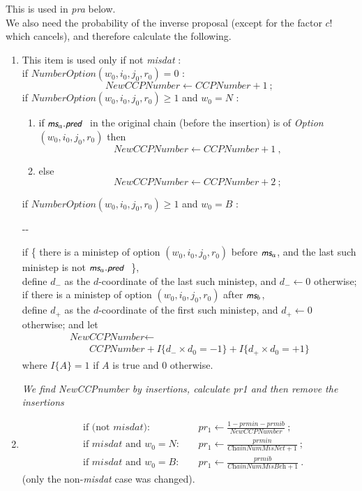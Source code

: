 \documentclass[a4paper,12pt,fleqn]{article}
\makeatletter
\newenvironment{frindentation}[2]
{\par \setlength{\leftmargin}{#1}       \setlength{\rightmargin}{#2}
  \advance\linewidth -\leftmargin       \advance\linewidth -\rightmargin
  \advance\@totalleftmargin\leftmargin  \@setpar{{\@@par}}%
  \parshape 1 \@totalleftmargin         \linewidth \ignorespaces
  \begin{minipage}[h]{\linewidth}\begin{framed}}{\end{framed}\end{minipage}\par}
\newcommand{\nnm}[1]{\textsf{\small\textit{#1}\ }}
\newcommand{\ms}{\textsl{\textsf{\small ms}}} %
\makeatother
\begin{document}
This is used in \textit{pra} below.\\
We also need the probability of the inverse proposal
(except for the factor $c! $ which cancels),
and therefore calculate the following.
\begin{enumerate}[resume]
\item This item is used only if not \textit{misdat} :\\
      if $\textit{NumberOption}(w_0,i_0,j_0,r_0) = 0$ :
      \[
        \textit{NewCCPNumber} \leftarrow \textit{CCPNumber} + 1 \ ;
      \]
      if $\textit{NumberOption}(w_0,i_0,j_0,r_0) \geq 1 $ and $w_0 = N$ :
      \begin{enumerate}
      \item if $\ms_a.\nnm{pred}$ in the original chain
         (before the insertion) is of \textit{Option} $(w_0,i_0,j_0,r_0)$
         then
          \[
            \textit{NewCCPNumber} \leftarrow \textit{CCPNumber} + 1 \ ,
           \]
      \item else
          \[
            \textit{NewCCPNumber} \leftarrow \textit{CCPNumber} + 2 \ ;
           \]
      \end{enumerate}
      if $\textit{NumberOption}(w_0,i_0,j_0,r_0) \geq 1$  and $w_0 = B$ :
      \begin{frindentation}{2em}{2em}
      if \{ there is a ministep of option $(w_0,i_0,j_0,r_0)$
      before $\ms_a$, and the last such ministep is not $\ms_a.\nnm{pred}$ \}, \\
      define $d_-$ as the $d$-coordinate of the last such ministep,
      and $d_- \leftarrow 0$  otherwise;\\
      if there is a ministep of option $(w_0,i_0,j_0,r_0)$
      after $\ms_b$, \\
      define $d_+$ as the $d$-coordinate of the first such ministep,
      and $d_+ \leftarrow 0$  otherwise; and let
      \begin{multline*}
             \textit{NewCCPNumber}  \leftarrow  \\
         \hspace{2em}     \textit{CCPNumber} + I\{d_- \times d_0 = -1\}
                        +  I\{d_+ \times d_0 = +1 \}
      \end{multline*}
      where $I\{A\} = 1$ if $A$ is true and 0 otherwise.
      \end{frindentation}
\emph{We find NewCCPnumber by insertions, calculate pr1 and then
remove the insertions}
\item
      \begin{align*}
     & \text{if (not } \textit{misdat}): && \ pr_1 \leftarrow
                \frac{1 - \textit{prmin} - \textit{prmib}}{\textit{NewCCPNumber} } \ ; \\[1em]
     &  \text{if } \textit{misdat} \text{ and } w_0 = N:   && \ pr_1 \leftarrow
                              \frac{\textit{prmin}}{\textit{ChainNumMisNet}+1 } \ ; \\[1em]
     &  \text{if } \textit{misdat} \text{ and } w_0 = B:  && \ pr_1 \leftarrow
                 \frac{\textit{prmib}}{\textit{ChainNumMisBeh}+1 } \ .
      \end{align*}
(only the non-\textit{misdat} case was changed).
\end{enumerate}
\end{document}
